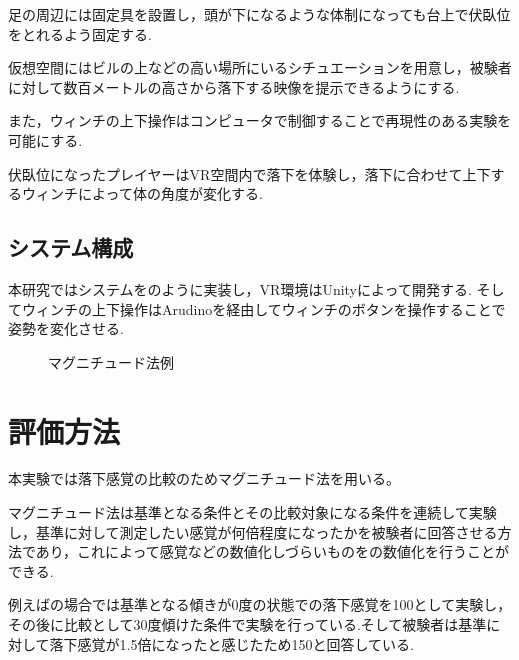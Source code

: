 \documentclass[uplatex]{jsarticle}
\begin{document}
足の周辺には固定具を設置し，頭が下になるような体制になっても台上で伏臥位をとれるよう固定する.

仮想空間にはビルの上などの高い場所にいるシチュエーションを用意し，被験者に対して数百メートルの高さから落下する映像を提示できるようにする.

また，ウィンチの上下操作はコンピュータで制御することで再現性のある実験を可能にする.

伏臥位になったプレイヤーはVR空間内で落下を体験し，落下に合わせて上下するウィンチによって体の角度が変化する.

\subsection{システム構成}
本研究ではシステムをのように実装し，VR環境はUnityによって開発する.
そしてウィンチの上下操作はArudinoを経由してウィンチのボタンを操作することで姿勢を変化させる.


 \begin{figure}[tb]
  \centering
  \caption{マグニチュード法例}
  \label{fig:magnitude}

\end{figure}

\section{評価方法}
本実験では落下感覚の比較のためマグニチュード法を用いる。

マグニチュード法は基準となる条件とその比較対象になる条件を連続して実験し，基準に対して測定したい感覚が何倍程度になったかを被験者に回答させる方法であり，これによって感覚などの数値化しづらいものをの数値化を行うことができる.

例えばの場合では基準となる傾きが0度の状態での落下感覚を100として実験し，その後に比較として30度傾けた条件で実験を行っている.そして被験者は基準に対して落下感覚が1.5倍になったと感じたため150と回答している.
\end{document}
